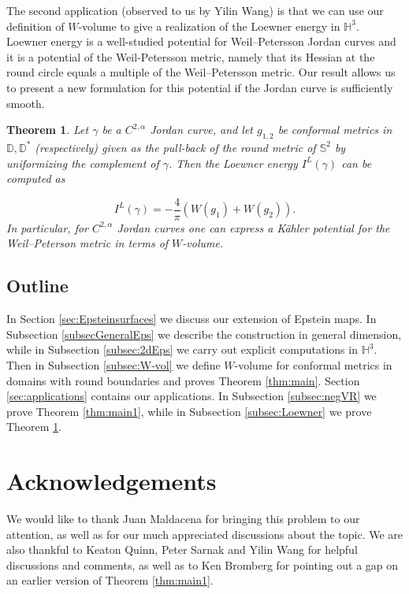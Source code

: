\documentclass[12pt]{amsart}
\newtheorem{maintheorem}{Theorem}[section]
\begin{document}
The second application (observed to us by Yilin Wang) is that we can use our definition of $W$-volume to give a realization of the Loewner energy in $\mathbb{H}^3$. Loewner energy is a well-studied potential for Weil--Petersson Jordan curves and it is a potential of the Weil-Petersson metric, namely that its Hessian at the round circle equals a multiple of the Weil--Petersson metric. Our result allows us to present a new formulation for this potential if the Jordan curve is sufficiently smooth.



\begin{maintheorem} \label{thm:main2}
Let $\gamma$ be a $C^{2,\alpha}$ Jordan curve, and let $g_{1,2}$ be conformal metrics in $\mathbb{D}, \mathbb{D}^*$ (respectively) given as the pull-back of the round metric of $\mathbb{S}^2$ by uniformizing the complement of $\gamma$. Then the Loewner energy $I^L(\gamma)$ can be computed as

\begin{equation}
I^L(\gamma) = -\frac{4}{\pi} (W(g_1)+W(g_2)).
\end{equation}
In particular, for $C^{2,\alpha}$ Jordan curves one can express a K\"ahler potential for the Weil--Peterson metric in terms of $W$-volume.
\end{maintheorem}


\subsection*{Outline} In Section \ref{sec:Epsteinsurfaces} we discuss our extension of Epstein maps.  In Subsection \ref{subsecGeneralEps} we describe the construction in general dimension, while in Subsection \ref{subsec:2dEps} we carry out explicit computations in $\mathbb{H}^3$. Then in Subsection \ref{subsec:W-vol} we define $W$-volume for conformal metrics in domains with round boundaries and proves Theorem \ref{thm:main}. Section \ref{sec:applications} contains our applications. In Subsection \ref{subsec:negVR} we prove Theorem \ref{thm:main1}, while in Subsection \ref{subsec:Loewner} we prove Theorem \ref{thm:main2}.

\section*{Acknowledgements}
We would like to thank Juan Maldacena for bringing this problem to our attention, as well as for our much appreciated discussions about the topic. We are also thankful to Keaton Quinn, Peter Sarnak and Yilin Wang for helpful discussions and comments, as well as to Ken Bromberg for pointing out a gap on an earlier version of Theorem \ref{thm:main1}.
\end{document}
